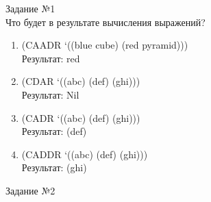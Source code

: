 \vspace*{10mm}

{\LARGE Задание №1}\\

Что будет в результате вычисления выражений?
\begin{enumerate}
\item (CAADR ‘((blue cube) (red pyramid)))\\
Результат: red
\begin{figure}[ht!]
\end{figure}
\item (CDAR ‘((abc) (def) (ghi)))\\
Результат: Nil
\begin{figure}[ht!]
\end{figure}
\item (CADR ‘((abc) (def) (ghi)))\\
Результат: (def)
\item (CADDR ‘((abc) (def) (ghi)))\\
Результат: (ghi)\\
\end{enumerate}

\newpage
\vspace*{10mm}

{\LARGE Задание №2}\\

